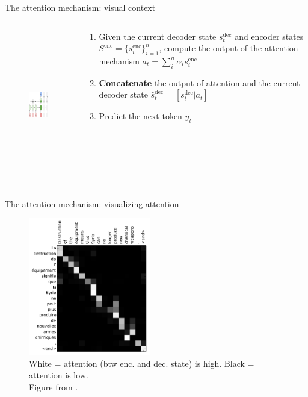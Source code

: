 \documentclass[12pt,aspectratio=169,handout]{beamer}
\begin{document}
\begin{frame}{The attention mechanism: visual context}

	\begin{columns}[T]
		\begin{column}{0.49\textwidth}
			\begin{figure}[h]
				\includegraphics[height=6.5cm]{seq2seq_attention_t1.pdf}
			\end{figure}	
		\end{column}
		\begin{column}{0.49\textwidth}
			\begin{enumerate}
			\pause
			\item Given the current decoder state $s^{\text{dec}}_t$ and encoder states $S^{\text{enc}} = \{s_i^{\text{enc}}\}_{i=1}^n$, 
				compute the output of the attention mechanism $a_t = \sum_i^n \alpha_i s_i^{\text{enc}}$
			\pause
			\item \textbf{Concatenate} the output of attention and the current decoder state $\hat{s}_t^{\text{dec}} = [s^{\text{dec}}_t | a_t]$
			\pause
			\item Predict the next token $y_t$
			\end{enumerate}
			\end{column}
	\end{columns}
	
\end{frame}

\begin{frame}{The attention mechanism: visualizing attention}
	\begin{figure}[h]
		\includegraphics[height=6cm]{translation_heatmap}
		\caption*{White = attention (btw enc. and dec. state) is high. Black = attention is low.\\ Figure from \cite{bahdanau2014neural}.}
	\end{figure}	
\end{frame}
\end{document}
